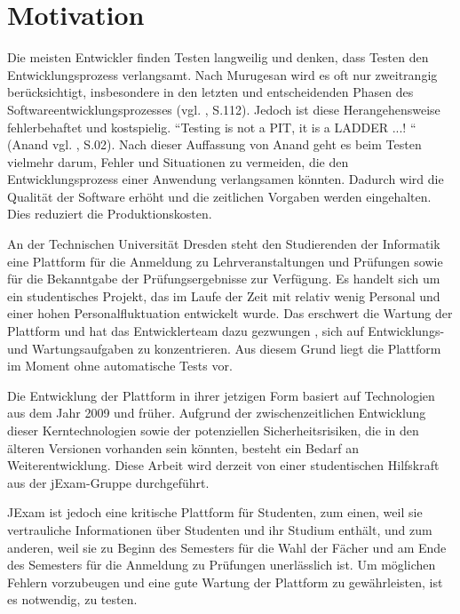 \section{Motivation}

Die meisten Entwickler finden Testen langweilig und denken, dass Testen den
Entwicklungsprozess verlangsamt. Nach Murugesan  wird es oft nur zweitrangig
berücksichtigt, insbesondere in den letzten und entscheidenden Phasen des
Softwareentwicklungsprozesses (vgl. \cite{526394}, S.112). Jedoch ist diese
Herangehensweise fehlerbehaftet und kostspielig. “Testing is not a PIT, it is a
LADDER ...! “ (Anand vgl. \cite{anand12importance} , S.02). Nach dieser Auffassung von
Anand geht es beim Testen vielmehr darum, Fehler und Situationen zu vermeiden,
die den Entwicklungsprozess einer Anwendung verlangsamen könnten.
Dadurch wird die Qualität der Software erhöht und die zeitlichen Vorgaben
werden eingehalten. Dies reduziert die Produktionskosten.


An der Technischen Universität Dresden steht den Studierenden der Informatik eine
Plattform für die Anmeldung zu Lehrveranstaltungen und Prüfungen sowie für die
Bekanntgabe der Prüfungsergebnisse zur Verfügung. Es handelt sich um ein
studentisches Projekt, das im Laufe der Zeit mit relativ wenig Personal
und einer hohen Personalfluktuation entwickelt wurde.  Das erschwert die
Wartung der Plattform und hat das Entwicklerteam dazu gezwungen , sich auf
Entwicklungs- und Wartungsaufgaben zu konzentrieren. Aus diesem Grund liegt
die Plattform im Moment ohne automatische Tests vor.


Die Entwicklung der Plattform in ihrer jetzigen Form basiert auf Technologien aus
dem Jahr 2009 und früher. Aufgrund der zwischenzeitlichen Entwicklung dieser
Kerntechnologien sowie der potenziellen Sicherheitsrisiken, die in den älteren
Versionen vorhanden sein könnten, besteht ein Bedarf an Weiterentwicklung.
Diese Arbeit wird derzeit von einer studentischen Hilfskraft aus der jExam-Gruppe
durchgeführt.


JExam ist jedoch eine kritische Plattform für Studenten, zum einen, weil sie
vertrauliche Informationen über Studenten und ihr Studium enthält, und zum
anderen, weil sie zu Beginn des Semesters für die Wahl der Fächer und am Ende
des Semesters für die Anmeldung zu Prüfungen unerlässlich ist. Um möglichen
Fehlern vorzubeugen und eine gute Wartung der Plattform zu gewährleisten, ist
es notwendig, zu testen.



